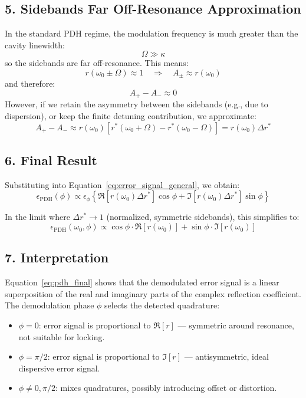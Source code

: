 \subsection*{5. Sidebands Far Off-Resonance Approximation}

In the standard PDH regime, the modulation frequency is much greater than the cavity linewidth:
\[
\Omega \gg \kappa
\]
so the sidebands are far off-resonance. This means:
\[
r(\omega_0 \pm \Omega) \approx 1 \quad \Rightarrow \quad A_\pm \approx r(\omega_0)
\]
and therefore:
\[
A_+ - A_- \approx 0
\]
However, if we retain the asymmetry between the sidebands (e.g., due to dispersion), or keep the finite detuning contribution, we approximate:
\[
A_+ - A_- \approx r(\omega_0) \left[ r^*(\omega_0 + \Omega) - r^*(\omega_0 - \Omega) \right] = r(\omega_0) \Delta r^*
\]

\subsection*{6. Final Result}

Substituting into Equation~\eqref{eq:error_signal_general}, we obtain:
\begin{equation}
\epsilon_{\text{PDH}}(\phi) \propto \epsilon_\phi \left\{
\Re[r(\omega_0) \Delta r^*] \cos\phi + \Im[r(\omega_0) \Delta r^*] \sin\phi
\right\}
\label{eq:error_signal_deltar}
\end{equation}

In the limit where \( \Delta r^* \rightarrow 1 \) (normalized, symmetric sidebands), this simplifies to:
\begin{equation}
\boxed{
\epsilon_{\text{PDH}}(\omega_0, \phi) \propto \cos\phi \cdot \Re[r(\omega_0)] + \sin\phi \cdot \Im[r(\omega_0)]
}
\label{eq:pdh_final}
\end{equation}

\subsection*{7. Interpretation}

Equation~\eqref{eq:pdh_final} shows that the demodulated error signal is a linear superposition of the real and imaginary parts of the complex reflection coefficient. The demodulation phase \( \phi \) selects the detected quadrature:
\begin{itemize}
    \item \( \phi = 0 \): error signal is proportional to \( \Re[r] \) — symmetric around resonance, not suitable for locking.
    \item \( \phi = \pi/2 \): error signal is proportional to \( \Im[r] \) — antisymmetric, ideal dispersive error signal.
    \item \( \phi \ne 0, \pi/2 \): mixes quadratures, possibly introducing offset or distortion.
\end{itemize}

